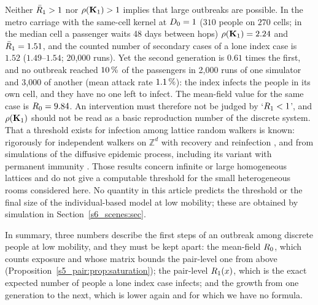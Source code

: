 \begin{remark}\label{s5_pair:rem:threshold}
Neither $\bar{R}_1>1$ nor $\rho(\mathbf{K}_1)>1$ implies that large outbreaks are possible. In the metro
carriage with the same-cell kernel at $D_0=1$ ($310$ people on $270$ cells; in the median cell a passenger
waits 48 days between hops) $\rho(\mathbf{K}_1)=2.24$ and $\bar{R}_1=1.51$, and the counted number of secondary cases of a lone index
case is $1.52$ ($1.49$--$1.54$; 20{,}000 runs). Yet the second generation is $0.61$ times the first, and no
outbreak reached $10\,\%$ of the passengers in 2{,}000 runs of one simulator and 3{,}000 of another (mean
attack rate $1.1\,\%$): the index infects the people in its own cell, and they have no one left to infect. The
mean-field value for the same case is $R_0=9.84$. An intervention must therefore not be judged by
`$R_1<1$', and $\rho(\mathbf{K}_1)$ should not be read as a basic reproduction number of the discrete
system. That a threshold exists for infection among lattice random walkers is known: rigorously for
independent walkers on $\mathbb{Z}^d$ with recovery and reinfection \citep{kesten2006phase}, and from
simulations of the diffusive epidemic process, including its variant with permanent immunity
\citep{maia2007diffusive,carvalho2025generalized}. Those results concern infinite or large homogeneous
lattices and do not give a computable threshold for the small heterogeneous rooms considered here. No
quantity in this article predicts the threshold or the final size of the individual-based model at low
mobility; these are obtained by simulation in Section~\ref{s6_scenes:sec}.
\end{remark}

In summary, three numbers describe the first steps of an outbreak among discrete people at low mobility, and
they must be kept apart: the mean-field $R_0$, which counts exposure and whose matrix bounds the pair-level
one from above (Proposition~\ref{s5_pair:prop:saturation}); the pair-level $R_1(x)$, which is the exact
expected number of people a lone index case infects; and the growth from one generation to the next, which
is lower again and for which we have no formula.
